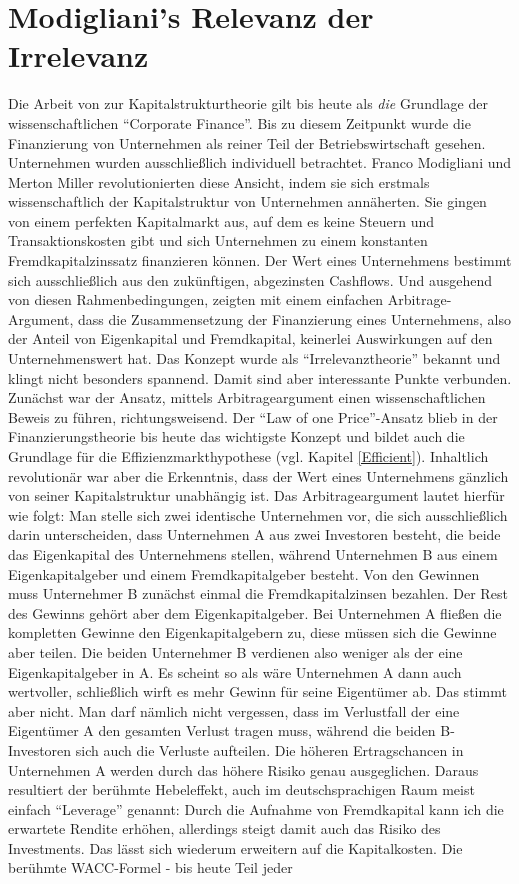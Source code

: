 \section{Modigliani's Relevanz der Irrelevanz}
\label{Struktur}
Die Arbeit von \textcite{Modigliani1958} zur Kapitalstrukturtheorie gilt bis heute als \textit{die} Grundlage der wissenschaftlichen "`Corporate Finance"'. Bis zu diesem Zeitpunkt wurde die Finanzierung von Unternehmen als reiner Teil der Betriebswirtschaft gesehen. Unternehmen wurden ausschließlich individuell betrachtet. Franco Modigliani und Merton Miller revolutionierten diese Ansicht, indem sie sich erstmals wissenschaftlich der Kapitalstruktur von Unternehmen annäherten. Sie gingen von einem perfekten Kapitalmarkt aus, auf dem es keine Steuern und Transaktionskosten gibt und sich Unternehmen zu einem konstanten Fremdkapitalzinssatz finanzieren können. Der Wert eines Unternehmens bestimmt sich ausschließlich aus den zukünftigen, abgezinsten Cashflows. Und ausgehend von diesen Rahmenbedingungen, zeigten \textcite{Modigliani1958} mit einem einfachen Arbitrage-Argument, dass die Zusammensetzung der Finanzierung eines Unternehmens, also der Anteil von Eigenkapital und Fremdkapital, keinerlei Auswirkungen auf den Unternehmenswert hat. Das Konzept wurde als "`Irrelevanztheorie"' bekannt und klingt nicht besonders spannend. Damit sind aber interessante Punkte verbunden. Zunächst war der Ansatz, mittels Arbitrageargument einen wissenschaftlichen Beweis zu führen, richtungsweisend. Der "`Law of one Price"'-Ansatz blieb in der Finanzierungstheorie bis heute das wichtigste Konzept und bildet auch die Grundlage für die Effizienzmarkthypothese (vgl. Kapitel \ref{Efficient}). Inhaltlich revolutionär war aber die Erkenntnis, dass der Wert eines Unternehmens gänzlich von seiner Kapitalstruktur unabhängig ist. Das Arbitrageargument lautet hierfür wie folgt: Man stelle sich zwei identische Unternehmen vor, die sich ausschließlich darin unterscheiden, dass Unternehmen A aus zwei Investoren besteht, die beide das Eigenkapital des Unternehmens stellen, während Unternehmen B aus einem Eigenkapitalgeber und einem Fremdkapitalgeber besteht. Von den Gewinnen muss Unternehmer B zunächst einmal die Fremdkapitalzinsen bezahlen. Der Rest des Gewinns gehört aber dem Eigenkapitalgeber. Bei Unternehmen A fließen die kompletten Gewinne den Eigenkapitalgebern zu, diese müssen sich die Gewinne aber teilen. Die beiden Unternehmer B verdienen also weniger als der eine Eigenkapitalgeber in A. Es scheint so als wäre Unternehmen A dann auch wertvoller, schließlich wirft es mehr Gewinn für seine Eigentümer ab. Das stimmt aber nicht. Man darf nämlich nicht vergessen, dass im Verlustfall der eine Eigentümer A den gesamten Verlust tragen muss, während die beiden B-Investoren sich auch die Verluste aufteilen. Die höheren Ertragschancen in Unternehmen A werden durch das höhere Risiko genau ausgeglichen. Daraus resultiert der berühmte Hebeleffekt, auch im deutschsprachigen Raum meist einfach "`Leverage"' genannt: Durch die Aufnahme von Fremdkapital kann ich die erwartete Rendite erhöhen, allerdings steigt damit auch das Risiko des Investments. Das lässt sich wiederum erweitern auf die Kapitalkosten. Die berühmte WACC-Formel - bis heute Teil jeder 